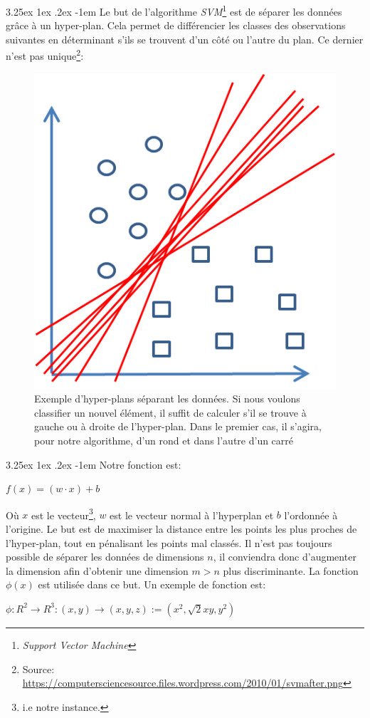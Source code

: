 \documentclass[a4paper, 11pt]{article}
\makeatletter
\renewcommand\paragraph{\@startsection{paragraph}{5}{\z@}%
  {3.25ex \@plus1ex \@minus.2ex}%
  {-1em}%
  {\normalfont\normalsize\bfseries}}
\makeatother
\begin{document}
\paragraph{}
Le but de l'algorithme \textit{SVM}\footnote{\textit{Support Vector Machine}} est de séparer les données grâce à un hyper-plan.
Cela permet de différencier les classes des observations suivantes en déterminant s'ils se trouvent d'un côté ou l'autre 
du plan. Ce dernier n'est pas unique\footnote{Source: \url{https://computersciencesource.files.wordpress.com/2010/01/svmafter.png}}: 
\begin{figure}[H]
\centering
\includegraphics{images/svm_exemple}
\caption{Exemple d'hyper-plans séparant les données. Si nous voulons classifier un nouvel élément, 
il suffit de calculer s'il se trouve à gauche ou à droite de l'hyper-plan. Dans le premier cas, il s'agira, 
pour notre algorithme, d'un rond et dans l'autre d'un carré}
\end{figure}

\paragraph{}
Notre fonction est:
\begin{center}
$f(x) = (w \cdot x) + b$
\end{center}
Où $x$ est le vecteur\footnote{i.e notre instance.}, $w$ est le vecteur normal à l'hyperplan et $b$ l'ordonnée à l'origine.
Le but est de maximiser la distance entre les points les plus proches de l'hyper-plan, tout en pénalisant 
les points mal classés. Il n'est pas toujours possible de séparer les données de dimensions $n$, 
il conviendra donc d'augmenter la dimension afin d'obtenir une dimension $m > n$ plus discriminante. 
La fonction $\phi(x)$ est utilisée dans ce but. Un exemple de fonction est:
\begin{center}
$\phi: R^2 \rightarrow R^3 :(x, y) \rightarrow (x, y, z):= (x^2, \sqrt{2}x y, y^2)$
\end{center}
\end{document}

